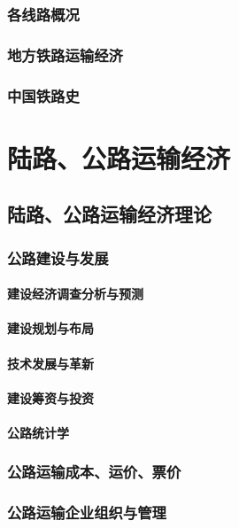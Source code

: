 \documentclass[UTF8]{../../RepresentationUniverse}
\begin{document}
    \subsection{各线路概况}
    \subsection{地方铁路运输经济}
    \subsection{中国铁路史}



\chapter{陆路、公路运输经济}

\section{陆路、公路运输经济理论}
    \subsection{公路建设与发展}
        \subsubsection{建设经济调查分析与预测}
        \subsubsection{建设规划与布局}
        \subsubsection{技术发展与革新}
        \subsubsection{建设筹资与投资}
        \subsubsection{公路统计学}
    \subsection{公路运输成本、运价、票价}
    \subsection{公路运输企业组织与管理}
\end{document}
